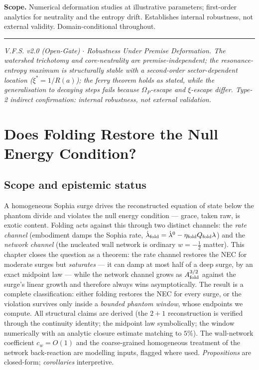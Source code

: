 \documentclass[11pt,a4paper,oneside]{book}
\newcommand{\Op}{\Omega_P}
\newcommand{\Qf}{Q_{\rm fold}}
\newcommand{\Af}{A_{\rm fold}}
\newcommand{\ldz}{\dot\lambda^{0}}
\newcommand{\ldf}{\dot\lambda_{\rm fold}}
\theoremstyle{plain}
\theoremstyle{definition}
\theoremstyle{remark}
\begin{document}
\textbf{Scope.} Numerical deformation studies at illustrative parameters; first-order analytics for
neutrality and the entropy drift. Establishes internal robustness, not external validity.
Domain-conditional throughout.

\vspace{0.5em}
\hrule
\smallskip
\noindent\footnotesize\emph{V.F.S. v2.0 (Open-Gate) $\cdot$ Robustness Under Premise Deformation. The
watershed trichotomy and core-neutrality are premise-independent; the resonance-entropy maximum is
structurally stable with a second-order sector-dependent location ($\xi^*=1/R(a)$); the ferry theorem
holds as stated, while the generalisation to decaying steps fails because $\Op$-escape and
$\xi$-escape differ. Type-2 indirect confirmation: internal robustness, not external validation.}

\chapter{Does Folding Restore the Null Energy Condition?}

\section*{Scope and epistemic status}
A homogeneous Sophia surge drives the reconstructed equation of state below the phantom divide and
violates the null energy condition --- grace, taken raw, is exotic content. Folding acts against this
through two distinct channels: the \emph{rate channel} (embodiment damps the Sophia rate,
$\ldf=\ldz-\eta_{\rm fold}\Qf\lambda$) and the \emph{network channel} (the nucleated wall network is
ordinary $w=-\tfrac12$ matter). This chapter closes the question as a theorem: the rate channel restores
the NEC for moderate surges but \emph{saturates} --- it can damp at most half of a deep surge, by an
exact midpoint law --- while the network channel grows as $\Af^{3/2}$ against the surge's linear growth
and therefore always wins asymptotically. The result is a complete classification: either folding
restores the NEC for every surge, or the violation survives only inside a \emph{bounded phantom window},
whose endpoints we compute. All structural claims are derived (the $2{+}1$ reconstruction is verified
through the continuity identity; the midpoint law symbolically; the window numerically with an analytic
closure estimate matching to $5\%$). The wall-network coefficient $c_w=O(1)$ and the coarse-grained
homogeneous treatment of the network back-reaction are modelling inputs, flagged where used.
\emph{Propositions} are closed-form; \emph{corollaries} interpretive.
\end{document}

